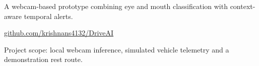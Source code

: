 \documentclass[aspectratio=169,10pt]{beamer}
\begin{document}
\begin{frame}[plain,t]
\vspace{4mm}
{\fontsize{9}{11}\selectfont A webcam-based prototype combining eye and mouth classification with context-aware temporal alerts.\par}
\vfill
{\fontsize{8}{10}\selectfont\href{https://github.com/krishnans4132/DriveAI}{github.com/krishnans4132/DriveAI}\par}
\vspace{2mm}
{\fontsize{7}{9}\selectfont\color{DarkSlate}Project scope: local webcam inference, simulated vehicle telemetry and a demonstration rest route.\par}
\vspace{3mm}
\end{frame}
\end{document}
